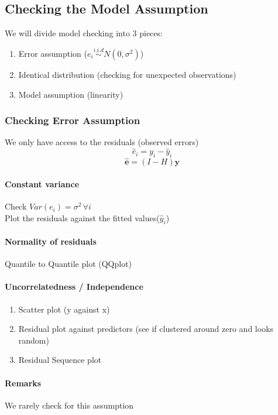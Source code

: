 \documentclass[11pt]{article}
\newcommand{\tb}[1]{\textbf{#1}}
\newcommand{\vy}[0]{\tb{y}}
\newcommand{\ve}[0]{\tb{e}}
\begin{document}
\subsection{Checking the Model Assumption}
We will divide model checking into 3 pieces:
\begin{enumerate}
    \item Error assumption ($e_i \overset{i.i.d}{\sim} N(0,  \sigma^2)$)
    \item Identical distribution (checking for unexpected observations)
    \item Model assumption (linearity)
\end{enumerate}
\subsubsection{Checking Error Assumption}
We only have access to the residuals (observed errors)
$$\hat{e}_i = y_i - \hat{y}_i$$
$$\hat{\ve} = (I - H)\vy$$
\paragraph{Constant variance}
Check $Var(e_i) = \sigma^2 \, \forall i$\\
Plot the residuals against the fitted values($\hat{y}_i$)
\paragraph{Normality of residuals}
Quantile to Quantile plot (QQplot)
\paragraph{Uncorrelatedness / Independence}
\begin{enumerate}
    \item Scatter plot (y against x)
    \item Residual plot against predictors (see if clustered around zero and looks random)
    \item Residual Sequence plot
\end{enumerate}
\paragraph{Remarks}
We rarely check for this assumption
\end{document}
